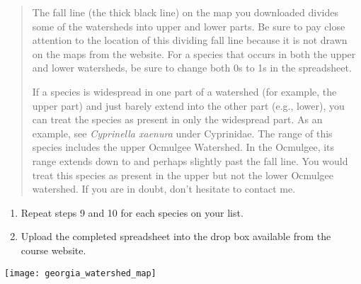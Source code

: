 \documentclass[12pt]{exam}
\begin{document}
\begin{quote}
The fall line (the thick black line) on the map you downloaded 
divides some of the watersheds into upper and lower parts. Be 
sure to pay close attention to the location of this dividing fall 
line because it is not drawn on the maps from the website. For a 
species that occurs in both the upper and lower watersheds, be 
sure to change both 0s to 1s in the spreadsheet.

If a species is widespread in one part of a watershed (for 
example, the upper part) and just barely extend into the other 
part (e.g., lower), you can treat the species as present in only 
the widespread part. As an example, see \emph{Cyprinella xaenura} 
under Cyprinidae. The range of this species includes the upper 
Ocmulgee Watershed. In the Ocmulgee, its range extends down to 
and perhaps slightly past the fall line. You would treat this 
species as present in the upper but not the lower Ocmulgee 
watershed. If you are in doubt, don't hesitate to contact me.
\end{quote}

\begin{enumerate}[resume]
\item
  Repeat steps 9 and 10 for each species on your list.
\item
  Upload the completed spreadsheet into the drop box available 
  from the course website.
\end{enumerate}
\newpage

\texttt{[image: georgia\_watershed\_map]}
\end{document}
